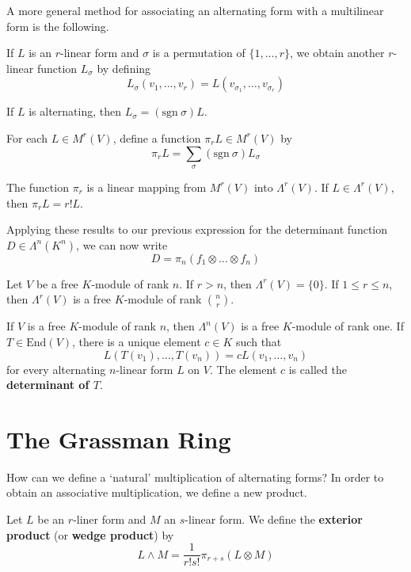 A more general method for associating an alternating form with a multilinear form is the following.

\begin{remark}
	If $L$ is an $r$-linear form and $\sigma$ is a permutation of $\{ 1, \ldots, r \}$, we obtain another $r$-linear function $L_\sigma$ by defining
	\[
		L_\sigma(v_1, \ldots, v_r) = L(v_{\sigma_1}, \ldots, v_{\sigma_r})
	\]
	
	If $L$ is alternating, then $L_\sigma = (\text{sgn}~\sigma) L$.
	
	For each $L \in M^r(V)$, define a function $\pi_r L \in M^r(V)$ by
	\[
		\pi_r L = \sum_\sigma (\text{sgn}~\sigma) L_\sigma
	\]
\end{remark}

\begin{lemma}
	The function $\pi_r$ is a linear mapping from $M^r(V)$ into $\Lambda^r(V)$. If $L \in \Lambda^r(V)$, then $\pi_r L = r! L$.
\end{lemma}

Applying these results to our previous expression for the determinant function $D \in \Lambda^n(K^n)$, we can now write
\[
	D = \pi_n (f_1 \otimes \ldots \otimes f_n)
\]

\begin{theorem}
	Let $V$ be a free $K$-module of rank $n$. If $r > n$, then $\Lambda^r(V) = \{ 0 \}$. If $1 \leq r \leq n$, then $\Lambda^r(V)$ is a free $K$-module of rank $\binom{n}{r}$.
\end{theorem}

\begin{corollary}
	If $V$ is a free $K$-module of rank $n$, then $\Lambda^n(V)$ is a free $K$-module of rank one. If $T \in \text{End}(V)$, there is a unique element $c \in K$ such that
	\[
		L(T(v_1), \ldots, T(v_n)) = cL(v_1, \ldots, v_n)
	\]
	for every alternating $n$-linear form $L$ on $V$. The element $c$ is called the \textbf{determinant of $T$}.
\end{corollary}

\section{The Grassman Ring}

How can we define a `natural' multiplication of alternating forms? In order to obtain an associative multiplication, we define a new product.

\begin{definition}
	Let $L$ be an $r$-liner form and $M$ an $s$-linear form. We define the \textbf{exterior product} (or \textbf{wedge product}) by
	\[
		L \wedge M = \frac{1}{r! s!} \pi_{r+s} (L \otimes M)
	\]
\end{definition}


